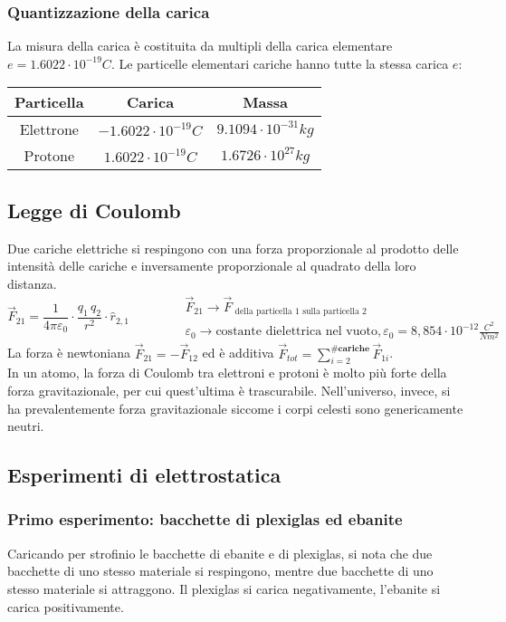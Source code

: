 \documentclass[a4paper]{article}
\begin{document}
\subsubsection*{Quantizzazione della carica}
La misura della carica è costituita da multipli della carica elementare \(e = 1.6022 \cdot 10^{-19} C\). Le particelle elementari
cariche hanno tutte la stessa carica \(e\):
\begin{center}
	\begin{tabular}{c c c}
		\textbf{Particella} & \textbf{Carica} & \textbf{Massa} \\
		\toprule
		Elettrone & \(-1.6022 \cdot 10^{-19} C\) & \(9.1094 \cdot 10^{-31} kg\) \\
		\midrule
		Protone & \(1.6022 \cdot 10^{-19} C\) & \(1.6726 \cdot 10^{27} kg\) \\
		\bottomrule
	\end{tabular}
\end{center}

\subsection{Legge di Coulomb}
Due cariche elettriche si respingono con una forza proporzionale al prodotto delle intensità delle cariche e inversamente
proporzionale al quadrato della loro distanza.
\[\vec{F}_{21} = \frac{1}{4 \pi \varepsilon_0} \cdot \frac{q_1 \, q_2}{r^2} \cdot \hat{r}_{2,1} \qquad \qquad \begin{matrix}
	\vec{F}_{21} \rightarrow \vec{F}_\text{ della particella 1 sulla particella 2}  \qquad \qquad \qquad \qquad \qquad \;\;\;\; \\
	\varepsilon_0 \rightarrow \text{costante dielettrica nel vuoto}, \varepsilon_0 = 8,854 \cdot 10^{-12} \frac{C^2}{Nm ^2}
\end{matrix}\]
La forza è newtoniana \(\vec{F}_{21} = -\vec{F}_{12}\) ed è additiva \(\vec{F}_{tot} = \sum_{i=2}^{\# \textbf{cariche}} \vec{F}_{1i}\). \\
In un atomo, la forza di Coulomb tra elettroni e protoni è molto più forte della forza gravitazionale, per cui quest'ultima è
trascurabile. Nell'universo, invece, si ha prevalentemente forza gravitazionale siccome i corpi celesti sono genericamente neutri.

\subsection{Esperimenti di elettrostatica}
\subsubsection*{Primo esperimento: bacchette di plexiglas ed ebanite}
Caricando per strofinio le bacchette di ebanite e di plexiglas, si nota che due bacchette di uno stesso materiale si respingono,
mentre due bacchette di uno stesso materiale si attraggono. Il plexiglas si carica negativamente, l'ebanite si carica positivamente.
\end{document}
